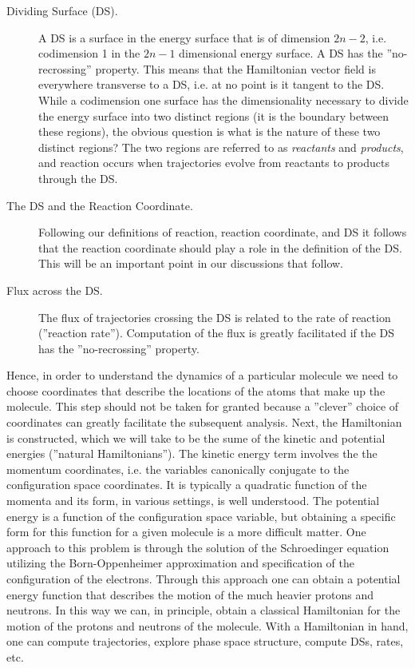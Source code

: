 \documentclass{article}
\begin{document}
\begin{description}
\item[Dividing Surface (DS).] A DS is a surface in the energy surface that is of dimension $2n-2$, i.e. codimension 1 in the $2n-1$ dimensional energy surface. A DS has the ''no-recrossing'' property.  This means that the Hamiltonian vector field is everywhere transverse to a DS, i.e. at no point is it tangent to the DS.  While a codimension one surface has the dimensionality necessary to divide the energy surface into two distinct regions (it is the boundary between these regions), the obvious question is what is the nature of these two distinct regions?  The two regions are referred to as {\em reactants} and {\em products}, and reaction occurs when trajectories evolve from reactants to products through the DS. 

\item[The DS and the Reaction Coordinate.] Following our definitions of reaction, reaction coordinate, and DS it follows that the reaction coordinate should play a role in the definition of the DS. This will be an important point in our discussions that follow.

\item[Flux across the DS.] The flux of trajectories crossing the DS is related to the  rate of reaction (''reaction rate'').  Computation of the flux is greatly facilitated if the DS has the ''no-recrossing'' property.



\end{description}




Hence, in order to understand the dynamics of a particular molecule we need to choose coordinates that describe the locations of the atoms that make up the molecule. This step should not be taken for granted because a ''clever'' choice of coordinates can greatly facilitate the subsequent analysis. Next, the Hamiltonian is constructed, which we will take to be the sume of the kinetic and potential energies (''natural Hamiltonians'').  The kinetic energy term involves the the momentum coordinates, i.e. the variables canonically conjugate to the configuration space coordinates. It is typically a quadratic function of the momenta and its form, in various settings, is well understood. The potential energy is a function of the configuration space variable, but obtaining a specific form for this function for a given molecule is a more difficult matter. One approach to this problem is through the solution of the Schroedinger equation utilizing the  Born-Oppenheimer approximation and specification of the configuration of the electrons. Through this approach one can obtain a potential energy function that describes the motion of the much heavier protons and neutrons. In this way we can, in principle, obtain a classical Hamiltonian for the  motion of the protons and neutrons of the molecule.
With a Hamiltonian in hand, one can compute trajectories, explore phase space structure, compute DSs, rates, etc.
\end{document}
